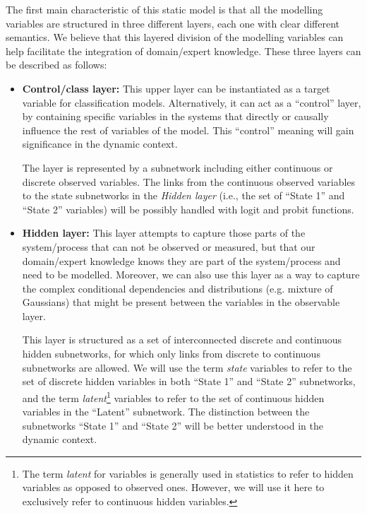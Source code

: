 The first main characteristic of this static model is that all the modelling variables are structured in three different
layers, each one with clear different semantics. We believe that this layered division of the modelling variables can
help facilitate the integration of domain/expert knowledge. These three layers can be described as follows:


\begin{itemize}

\item \textbf{Control/class layer:}  This upper layer can be instantiated as a target variable for classification models. Alternatively, it can  act as a ``control'' layer, by containing specific variables in the systems that directly or causally influence the rest of variables of the model. This ``control'' meaning will gain significance in the dynamic context.

The layer is represented by a subnetwork including either continuous or discrete observed variables. The links from the continuous observed variables to the state subnetworks in the \textit{Hidden layer} (i.e., the set of ``State 1'' and ``State 2'' variables) will be possibly handled with logit and probit functions.

\item \textbf{Hidden layer:}  This layer attempts to capture those parts of the system/process that can not be observed or measured, but that our domain/expert knowledge knows they are part of the system/process and need to be modelled. Moreover, we can also use this layer as a way to capture the complex conditional dependencies and distributions (e.g. mixture of Gaussians) that might be present between the variables in the observable layer. 

This layer is structured as a set of interconnected discrete and continuous hidden subnetworks, for which only links from discrete to continuous subnetworks are allowed. We will use the term \textit{state} variables to refer to the set of discrete hidden variables in both ``State 1'' and ``State 2'' subnetworks, and the term \textit{latent}\footnote{The term \textit{latent} for variables is generally used in statistics to refer to hidden variables as opposed to observed ones. However, we will use it here to exclusively refer to continuous hidden variables.} variables to refer to the set of continuous hidden variables in the ``Latent'' subnetwork. The distinction between the subnetworks ``State 1'' and ``State 2'' will be better understood in the dynamic context. 


\end{itemize}
